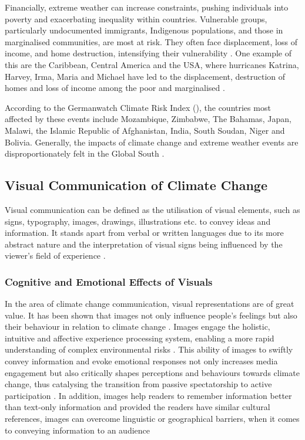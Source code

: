 Financially, extreme weather can increase constraints, pushing individuals into poverty and exacerbating inequality within countries. Vulnerable groups, particularly undocumented immigrants, Indigenous populations, and those in marginalised communities, are most at risk. They often face displacement, loss of income, and home destruction, intensifying their vulnerability \parencite[1206]{ipcc2023_wg2_8}. One example of this are the Caribbean, Central America and the USA, where hurricanes Katrina, Harvey, Irma, Maria and Michael have led to the displacement, destruction of homes and loss of income among the poor and marginalised \parencite{Klinenberg2020}.

According to the Germanwatch Climate Risk Index (\citeyear{Germanwatch2021}),  the countries most affected by these events include Mozambique, Zimbabwe, The Bahamas, Japan, Malawi, the Islamic Republic of Afghanistan, India, South Soudan, Niger and Bolivia. Generally, the impacts of climate change and extreme weather events are disproportionately felt in the Global South \parencite[1180]{ipcc2023_wg2_8}.

\subsection{Visual Communication of Climate Change}

Visual communication can be defined as the utilisation of visual elements, such as signs, typography, images, drawings, illustrations etc. to convey ideas and information. It stands apart from verbal or written languages due to its more abstract nature and the interpretation of visual signs being influenced by the viewer's field of experience \parencite{Smith2004}.

\subsubsection{Cognitive and Emotional Effects of Visuals}

In the area of climate change communication, visual representations are of great value. It has been shown that images not only influence people's feelings but also their behaviour in relation to climate change \parencite{Leiserowitz2006}. Images engage the holistic, intuitive and affective experience processing system, enabling a more rapid understanding of complex environmental risks \parencite{Epstein1994, Joffe2008}. This ability of images to swiftly convey information and evoke emotional responses not only increases media engagement but also critically shapes perceptions and behaviours towards climate change, thus catalysing the transition from passive spectatorship to active participation \parencite{Keib2018}. In addition, images help readers to remember information better than text-only information \parencite{Coleman2009, Graber1990} and provided the readers have similar cultural references, images can overcome linguistic or geographical barriers, when it comes to conveying information to an audience \parencite{Armfield2013}

